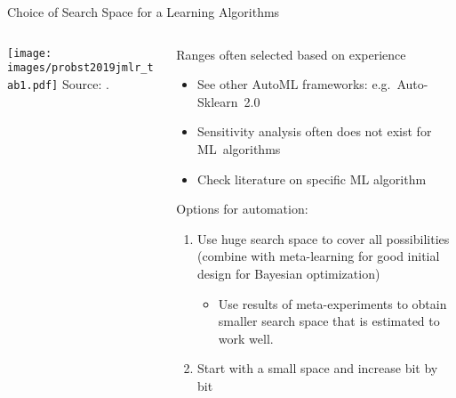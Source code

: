 	  \begin{frame}{Choice of Search Space for a Learning Algorithms}
		\begin{columns}
			
			\begin{column}{0.4\textwidth}
				\begin{center}
						\texttt{[image: images/probst2019jmlr\_tab1.pdf]}
					{\tiny Source: .}
				\end{center}
			\end{column}
			
		  \begin{column}{0.6\textwidth}
		  
		  Ranges often selected based on experience
		  \begin{itemize}
	  
			\item See other AutoML frameworks: e.g.\ Auto-Sklearn~2.0 
	  
			\item Sensitivity analysis often does not exist for ML~algorithms
			\item Check literature on specific ML algorithm
		  \end{itemize}
		  Options for automation:
		  \begin{enumerate}
			\item Use huge search space to cover all possibilities \\ 
				  (combine with meta-learning for good initial design for Bayesian optimization)
			\begin{itemize} 
					\item Use results of meta-experiments to obtain smaller search space that is estimated to work well.
			 \end{itemize}
			   \item Start with a small space and increase bit by bit
		  \end{enumerate}
		  \end{column}%
	  
		\end{columns}
	  \end{frame}
	  
